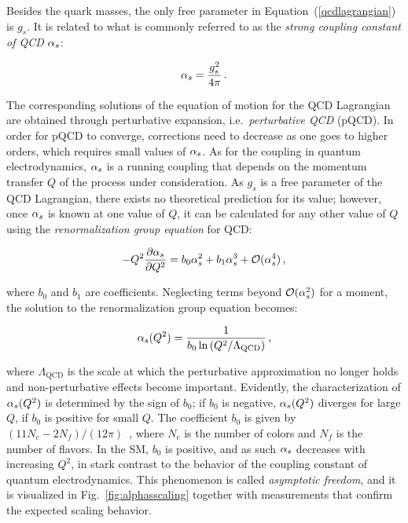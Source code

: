 Besides the quark masses, the only free parameter in Equation~(\ref{qcdlagrangian}) is $g_s$.
% 
It is related to what is commonly referred to as the \textit{strong coupling constant of QCD} $\alpha_s$:
% 
\begin{linenomath*}
\begin{equation}
\alpha_s = \frac{g_s^2}{4\pi}
\,.
\end{equation}
\end{linenomath*}
% 
The corresponding solutions of the equation of motion for the QCD Lagrangian are obtained through perturbative expansion, i.e.\ \textit{perturbative QCD} (pQCD).
% 
In order for pQCD to converge, corrections need to decrease as one goes to higher orders, which requires small values of $\alpha_s$.
% 
As for the coupling in quantum electrodynamics, $\alpha_s$ is a running coupling that depends on the momentum transfer $Q$ of the process under consideration.
% 
As $g_s$ is a free parameter of the QCD Lagrangian, there exists no theoretical prediction for its value; however, once $\alpha_s$ is known at one value of $Q$, it can be calculated for any other value of $Q$ using the \textit{renormalization group equation} for QCD:
% 
\begin{linenomath*}
\begin{equation}
- Q^2 \frac{\partial\alpha_s}{\partial Q^2} = b_0 \alpha_s^2 + b_1 \alpha_s^3 + \mathcal{O}(\alpha_s^4)
\,,
\end{equation}
\end{linenomath*}
% 
where $b_0$ and $b_1$ are coefficients.
% 
Neglecting terms beyond $\mathcal{O}(\alpha_s^2)$ for a moment, the solution to the renormalization group equation becomes:
% 
\begin{linenomath*}
\begin{equation}
\alpha_s(Q^2) = \frac{1}{b_0 \ln \left( Q^2 / \Lambda_\text{QCD} \right)}
\,,
\end{equation}
\end{linenomath*}
% 
where $\Lambda_\text{QCD}$ is the scale at which the perturbative approximation no longer holds and non-perturbative effects become important.
% 
Evidently, the characterization of $\alpha_s(Q^2)$ is determined by the sign of $b_0$; if $b_0$ is negative, $\alpha_s(Q^2)$ diverges for large $Q$, if $b_0$ is positive for small $Q$.
% 
The coefficient $b_0$ is given by $(11 N_c - 2 N_f) / (12\pi)$~\cite{Dissertori:2015tfa}, where $N_c$ is the number of colors and $N_f$ is the number of flavors.
% 
In the SM, $b_0$ is positive, and as such $\alpha_s$ decreases with increasing $Q^2$, in stark contrast to the behavior of the coupling constant of quantum electrodynamics.
% 
This phenomenon is called \textit{asymptotic freedom}, and it is visualized in Fig.~\ref{fig:alphasscaling} together with measurements that confirm the expected scaling behavior.

